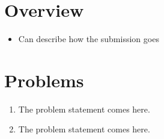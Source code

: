 \documentclass{Assignment}
\begin{document}
\maketitlepage

\section{Overview}
\printtopicsandauthors
\begin{itemize}
    \item Can describe how the submission goes
\end{itemize}

\section{Problems}
\begin{enumerate}
    \item \begin{problem}
    The problem statement comes here.
    \end{problem}
    
    \item \begin{problem}[Problem 2]
    The problem statement comes here.
    \supercite{label1}
    \cite{label2}
    \end{problem}
\end{enumerate}

\printbibliography
\end{document}
